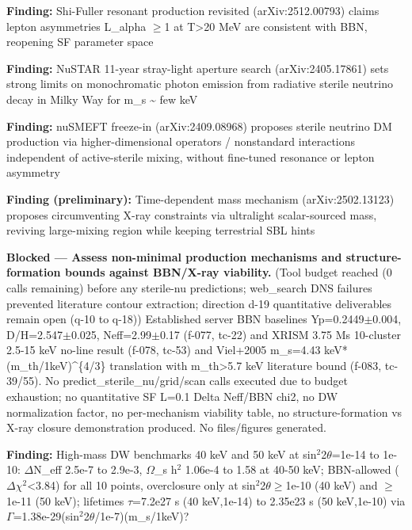 \documentclass[11pt,a4paper]{article}
\begin{document}
\textbf{Finding:} Shi-Fuller resonant production revisited (arXiv:2512.00793) claims lepton asymmetries L\_alpha $\geq$1 at T\textgreater{}20 MeV are consistent with BBN, reopening SF parameter space

\textbf{Finding:} NuSTAR 11-year stray-light aperture search (arXiv:2405.17861) sets strong limits on monochromatic photon emission from radiative sterile neutrino decay in Milky Way for m\_s \textasciitilde{} few keV

\textbf{Finding:} nuSMEFT freeze-in (arXiv:2409.08968) proposes sterile neutrino DM production via higher-dimensional operators / nonstandard interactions independent of active-sterile mixing, without fine-tuned resonance or lepton asymmetry

\textbf{Finding (preliminary):} Time-dependent mass mechanism (arXiv:2502.13123) proposes circumventing X-ray constraints via ultralight scalar-sourced mass, reviving large-mixing region while keeping terrestrial SBL hints

\textbf{Blocked --- Assess non-minimal production mechanisms and structure-formation bounds against BBN/X-ray viability.} (Tool budget reached (0 calls remaining) before any sterile-nu predictions; web\_search DNS failures prevented literature contour extraction; direction d-19 quantitative deliverables remain open (q-10 to q-18)) Established server BBN baselines Yp=0.2449$\pm$0.004, D/H=2.547$\pm$0.025, Neff=2.99$\pm$0.17 (f-077, tc-22) and XRISM 3.75 Ms 10-cluster 2.5-15 keV no-line result (f-078, tc-53) and Viel+2005 m\_s=4.43 keV*(m\_th/1keV)\textasciicircum{}\{4/3\} translation with m\_th\textgreater{}5.7 keV literature bound (f-083, tc-39/55). No predict\_sterile\_nu/grid/scan calls executed due to budget exhaustion; no quantitative SF L=0.1 Delta Neff/BBN chi2, no DW normalization factor, no per-mechanism viability table, no structure-formation vs X-ray closure demonstration produced. No files/figures generated.

\textbf{Finding:} High-mass DW benchmarks 40 keV and 50 keV at sin$^2$2$\theta$=1e-14 to 1e-10: $\Delta$N\_eff 2.5e-7 to 2.9e-3, $\Omega$\_s h$^2$ 1.06e-4 to 1.58 at 40-50 keV; BBN-allowed ($\Delta$$\chi$$^2$\textless{}3.84) for all 10 points, overclosure only at sin$^2$2$\theta$$\geq$1e-10 (40 keV) and $\geq$1e-11 (50 keV); lifetimes $\tau$=7.2e27 s (40 keV,1e-14) to 2.35e23 s (50 keV,1e-10) via $\Gamma$=1.38e-29(sin$^2$2$\theta$/1e-7)(m\_s/1keV)?
\end{document}
